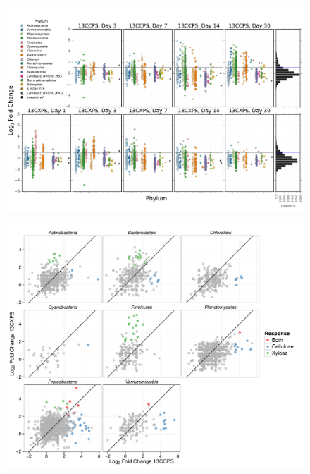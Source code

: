 \begin{figure}[H]
	\begin{center}
	\centerline{\includegraphics[width=11.4cm]{figures/l2fc_fig1/l2fc_fig.pdf}}
	\caption{\protect}\label{fig:l2fc}
        \end{center}
\end{figure}

\begin{figure}[H]
	\begin{center}
    \centerline{\includegraphics[width=\textwidth]{figures/generalist_specialist/generalist_specialist.pdf}}
    \caption{\protect}\label{fig:genspec}
    \end{center} 
\end{figure}

\restoregeometry
